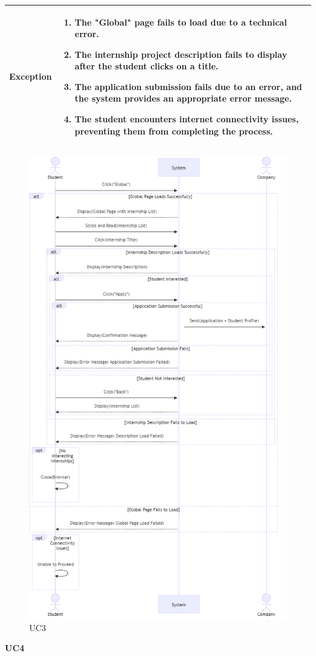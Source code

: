 \begin{longtable}{|p{}|p{}|}
\hline
\textbf{Exception} &  
\begin{enumerate}
    \item  The "Global" page fails to load due to a technical error.
    \item  The internship project description fails to display after the student clicks on a title.
    \item  The application submission fails due to an error, and the system provides an appropriate error message.
    \item  The student encounters internet connectivity issues, preventing them from completing the process.
\end{enumerate}\\
\hline
\end{longtable}

\begin{figure}[H]
    \centering
    \includegraphics[width=0.7\linewidth]{RASD//Images/UC3.png}
    \caption{UC3}
\end{figure}

\pagebreak
\textbf{UC4}

